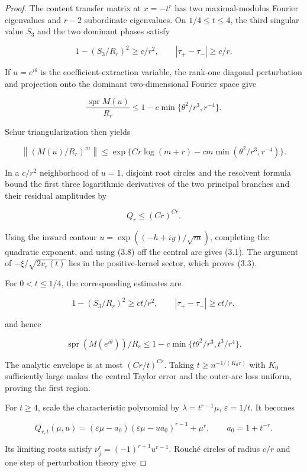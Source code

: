 \documentclass[10pt]{article}
\begin{document}
\begin{proof}


The content transfer matrix at $x=-t^r$ has two maximal-modulus Fourier
eigenvalues and $r-2$ subordinate eigenvalues.  On $1/4\le t\le4$, the
third singular value $S_3$ and the two dominant phases satisfy

\[
 1-(S_3/R_r)^2\ge c/r^2,
 \qquad |\tau_+-\tau_-|\ge c/r. \tag{3.6}
\]

If $u=e^{i\theta}$ is the coefficient-extraction variable, the rank-one
diagonal perturbation and projection onto the dominant two-dimensional
Fourier space give

\[
 \frac{\operatorname{spr}M(u)}{R_r}
 \le1-c\min\{\theta^2/r^3,r^{-4}\}. \tag{3.7}
\]

Schur triangularization then yields

\[
 \left\|\left(M(u)/R_r\right)^m\right\|
 \le\exp\{Cr\log(m+r)-cm\min(\theta^2/r^3,r^{-4})\}. \tag{3.8}
\]

In a $c/r^2$ neighborhood of $u=1$, disjoint root circles and the
resolvent formula bound the first three logarithmic derivatives of the two
principal branches and their residual amplitudes by

\[
 Q_r\le(Cr)^{Cr}. \tag{3.9}
\]

Using the inward contour
$u=\exp((-h+iy)/\sqrt m)$, completing the quadratic exponent, and using
(3.8) off the central arc gives (3.1).  The argument of
$-\xi/\sqrt{2v_r(t)}$ lies in the positive-kernel sector, which proves
(3.3).

For $0<t\le1/4$, the corresponding estimates are

\[
 1-(S_3/R_r)^2\ge ct/r^2,
 \qquad |\tau_+-\tau_-|\ge ct/r, \tag{3.10}
\]

and hence

\[
 \operatorname{spr}(M(e^{i\theta}))/R_r
 \le1-c\min\{t\theta^2/r^3,t^3/r^4\}. \tag{3.11}
\]

The analytic envelope is at most $(Cr/t)^{Cr}$.  Taking
$t\ge n^{-1/(K_0r)}$ with $K_0$ sufficiently large makes the central
Taylor error and the outer-arc loss uniform, proving the first region.

For $t\ge4$, scale the characteristic polynomial by
$\lambda=t^{r-1}\mu$, $\varepsilon=1/t$.  It becomes

\[
 Q_{r,t}(\mu,u)
 =(\varepsilon\mu-a_0)(\varepsilon\mu-ua_0)^{r-1}+\mu^r,
 \qquad a_0=1+t^{-r}. \tag{3.12}
\]

Its limiting roots satisfy
$\nu_j^r=(-1)^{r+1}u^{r-1}$.  Rouché circles of radius $c/r$ and one
step of perturbation theory give


\end{proof}
\end{document}
